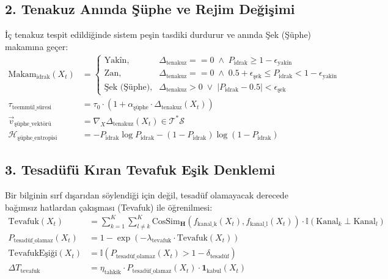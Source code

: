 \documentclass[11pt, a4paper]{article}
\begin{document}
\subsection{2. Tenakuz Anında Şüphe ve Rejim Değişimi}
İç tenakuz tespit edildiğinde sistem peşin tasdiki durdurur ve anında Şek (Şüphe) makamına geçer:
\begin{align}
\text{Makam}_{\text{idrak}}(X_t) &= 
\begin{cases}
\text{Yakîn}, & \Delta_{\text{tenakuz}} == 0 \;\land\; P_{\text{idrak}} \ge 1 - \epsilon_{\text{yakîn}} \\
\text{Zan}, & \Delta_{\text{tenakuz}} == 0 \;\land\; 0.5 + \epsilon_{\text{şek}} \le P_{\text{idrak}} < 1 - \epsilon_{\text{yakîn}} \\
\text{Şek (Şüphe)}, & \Delta_{\text{tenakuz}} > 0 \;\lor\; |P_{\text{idrak}} - 0.5| < \epsilon_{\text{şek}}
\end{cases} \\
\tau_{\text{teemmül\_süresi}} &= \tau_0 \cdot \left( 1 + \alpha_{\text{şüphe}} \cdot \Delta_{\text{tenakuz}}(X_t) \right) \\
\vec{v}_{\text{şüphe\_vektörü}} &= \nabla_{X} \Delta_{\text{tenakuz}}(X_t) \in \mathcal{T}^*\mathcal{S} \\
\mathcal{H}_{\text{şüphe\_entropisi}} &= -P_{\text{idrak}} \log P_{\text{idrak}} - (1 - P_{\text{idrak}}) \log (1 - P_{\text{idrak}})
\end{align}

\subsection{3. Tesadüfü Kıran Tevafuk Eşik Denklemi}
Bir bilginin sırf dışarıdan söylendiği için değil, tesadüf olamayacak derecede bağımsız hatlardan çakışması (Tevafuk) ile öğrenilmesi:
\begin{align}
\text{Tevafuk}(X_t) &= \sum_{k=1}^K \sum_{l \ne k}^K \text{CosSim}_{\mathbf{H}}\left( f_{\text{kanal\_k}}(X_t), f_{\text{kanal\_l}}(X_t) \right) \cdot \mathbb{I}\left( \text{Kanal}_k \perp \text{Kanal}_l \right) \\
P_{\text{tesadüf\_olamaz}}(X_t) &= 1 - \exp\left( -\lambda_{\text{tevafuk}} \cdot \text{Tevafuk}(X_t) \right) \\
\text{TevafukEşiği}(X_t) &= \mathbb{I}\left( P_{\text{tesadüf\_olamaz}}(X_t) > 1 - \delta_{\text{tesadüf}} \right) \\
\Delta T_{\text{tevafuk}} &= \eta_{\text{tahkik}} \cdot P_{\text{tesadüf\_olamaz}}(X_t) \cdot \mathbf{1}_{\text{kabul}}(X_t)
\end{align}
\end{document}
